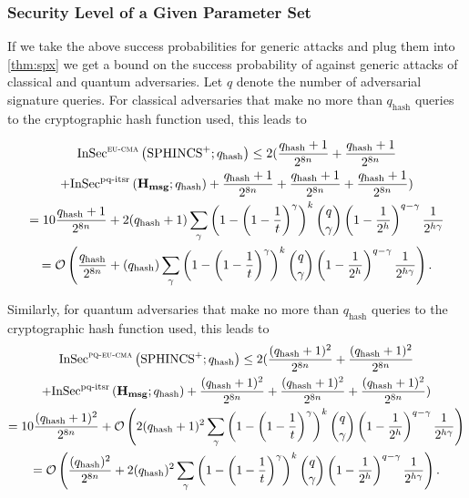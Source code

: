 \subsubsection{Security Level of a Given Parameter Set}
If we take the above success probabilities for generic attacks and plug them 
into \autoref{thm:spx} we get a bound on the success probability of \spx 
against generic attacks of classical and quantum adversaries. Let $q$ denote
the number of adversarial signature queries.
For classical 
adversaries that make no more than $q_{\text{hash}}$ queries to the 
cryptographic hash function used, this leads to 

\begin{multline}\label{eqn:classical-sec-level}
 {\mathrm{InSec}}^{{\mathsf{\textsc{{eu\text{-}cma}}}}}\left( {{\textrm{SPHINCS}^+}}; {q_{\text{hash}}} \right)  \leq 2(\frac{q_{\text{hash}}+1}{2^{8n}}+\frac{q_{\text{hash}}+1}{2^{8n}} \\
 + {\mathrm{InSec}}^{{\text{pq-itsr}}}\left( {\mathbf{H_{msg}}}; {q_{\text{hash}}} \right) + \frac{q_{\text{hash}}+1}{2^{8n}}+\frac{q_{\text{hash}}+1}{2^{8n}}+\frac{q_{\text{hash}}+1}{2^{8n}})\\
 = 10\frac{q_{\text{hash}}+1}{2^{8n}} + 2(q_{\text{hash}}+1) \sum_\gamma
  \left(1-\left(1-{1\over t}\right)^\gamma\right)^k
  {q\choose \gamma}
  \left(1-{1\over 2^h}\right)^{q-\gamma}
  {1\over 2^{h\gamma}}\\
 = \mathcal{O}\left(\frac{q_{\text{hash}}}{2^{8n}} + (q_{\text{hash}}) \sum_\gamma
  \left(1-\left(1-{1\over t}\right)^\gamma\right)^k
  {q\choose \gamma}
  \left(1-{1\over 2^h}\right)^{q-\gamma}
  {1\over 2^{h\gamma}}\right) 
  .
 \end{multline}

Similarly, for quantum adversaries that make no more than $q_{\text{hash}}$ queries to the 
cryptographic hash function used, this leads to  
\begin{multline}\label{eqn:quantum-sec-level}
 {\mathrm{InSec}}^{{\mathsf{\textsc{{pq\text{-}eu\text{-}cma}}}}}\left( {{\textrm{SPHINCS}^+}}; {q_{\text{hash}}} \right)  \leq 2(\frac{(q_{\text{hash}}+1)^2}{2^{8n}}+\frac{(q_{\text{hash}}+1)^2}{2^{8n}} \\
 + {\mathrm{InSec}}^{{\text{pq-itsr}}}\left( {\mathbf{H_{msg}}}; {q_{\text{hash}}} \right) + \frac{(q_{\text{hash}}+1)^2}{2^{8n}}+\frac{(q_{\text{hash}}+1)^2}{2^{8n}}+\frac{(q_{\text{hash}}+1)^2}{2^{8n}})\\
 = 10\frac{(q_{\text{hash}}+1)^2}{2^{8n}} + \mathcal{O}\left(2(q_{\text{hash}}+1)^2 \sum_\gamma
  \left(1-\left(1-{1\over t}\right)^\gamma\right)^k
  {q\choose \gamma}
  \left(1-{1\over 2^h}\right)^{q-\gamma}
  {1\over 2^{h\gamma}}\right)\\
  = \mathcal{O}\left(\frac{(q_{\text{hash}})^2}{2^{8n}} + 2(q_{\text{hash}})^2 \sum_\gamma
  \left(1-\left(1-{1\over t}\right)^\gamma\right)^k
  {q\choose \gamma}
  \left(1-{1\over 2^h}\right)^{q-\gamma}
  {1\over 2^{h\gamma}}\right).
\end{multline}

